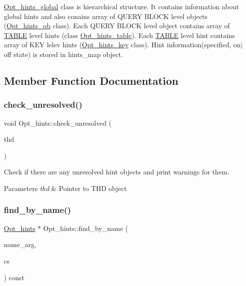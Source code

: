 \mbox{\hyperlink{classOpt__hints__global}{Opt\+\_\+hints\+\_\+global}} class is hierarchical structure. It contains information about global hints and also conains array of Q\+U\+E\+RY B\+L\+O\+CK level objects (\mbox{\hyperlink{classOpt__hints__qb}{Opt\+\_\+hints\+\_\+qb}} class). Each Q\+U\+E\+RY B\+L\+O\+CK level object contains array of \mbox{\hyperlink{structTABLE}{T\+A\+B\+LE}} level hints (class \mbox{\hyperlink{classOpt__hints__table}{Opt\+\_\+hints\+\_\+table}}). Each \mbox{\hyperlink{structTABLE}{T\+A\+B\+LE}} level hint contains array of K\+EY lelev hints (\mbox{\hyperlink{classOpt__hints__key}{Opt\+\_\+hints\+\_\+key}} class). Hint information(specified, on$\vert$off state) is stored in hints\+\_\+map object. 

\subsection{Member Function Documentation}
\mbox{\label{classOpt__hints_ab8841b8df145a91508a091c59046f162}} 
\subsubsection{\texorpdfstring{check\+\_\+unresolved()}{check\_unresolved()}}
{\footnotesize\ttfamily void Opt\+\_\+hints\+::check\+\_\+unresolved (\begin{DoxyParamCaption}\item[{T\+HD $\ast$}]{thd }\end{DoxyParamCaption})}

Check if there are any unresolved hint objects and print warnings for them.


\begin{DoxyParams}{Parameters}
{\em thd} & Pointer to T\+HD object \\
\hline
\end{DoxyParams}
\mbox{\label{classOpt__hints_a87c03b089de34abc1e119297e1126f42}} 
\subsubsection{\texorpdfstring{find\+\_\+by\+\_\+name()}{find\_by\_name()}}
{\footnotesize\ttfamily \mbox{\hyperlink{classOpt__hints}{Opt\+\_\+hints}} $\ast$ Opt\+\_\+hints\+::find\+\_\+by\+\_\+name (\begin{DoxyParamCaption}\item[{const L\+E\+X\+\_\+\+C\+S\+T\+R\+I\+NG $\ast$}]{name\+\_\+arg,  }\item[{const C\+H\+A\+R\+S\+E\+T\+\_\+\+I\+N\+FO $\ast$}]{cs }\end{DoxyParamCaption}) const}

